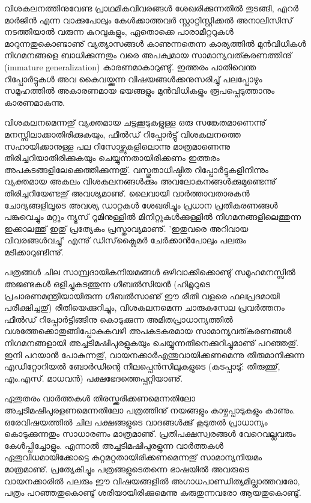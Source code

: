 വിശകലനത്തിനുവേണ്ട പ്രാഥമികവിവരങ്ങള്‍ ശേഖരിക്കുന്നതില്‍ തുടങ്ങി, എറര്‍ മാര്‍ജിന്‍ എന്ന വാക്കുപോലും 
കേള്‍ക്കാത്തവര്‍ സ്റ്റാറ്റിസ്റ്റിക്കല്‍ അനാലിസിസ് നടത്തിയാല്‍ വരുന്ന കുറവുകളും, ഏതൊക്കെ പാരാമീറ്ററുകള്‍ 
മാറുന്നതുകൊണ്ടാണു് വ്യത്യാസങ്ങള്‍ കാണുന്നതെന്ന കാര്യത്തില്‍ മുന്‍വിധികള്‍ നിഗമനങ്ങളെ ബാധിക്കുന്നതും വരെ 
അപക്വമായ സാമാന്യവത്കരണത്തിനു് (immature generalization) കാരണമാകാറുണ്ടു്. ഇത്തരം പാതിവെന്ത 
റിപ്പോര്‍ട്ടുകള്‍ അവ കൈവയ്ക്കുന്ന വിഷയങ്ങള്‍ക്കനുസരിച്ചു് പലപ്പോഴും സമൂഹത്തില്‍ അകാരണമായ ഭയങ്ങളും 
മുന്‍വിധികളും രൂപപ്പെടുത്താനും കാരണമാകുന്നു.

വിശകലനമെന്നതു് വ്യക്തമായ ചട്ടക്കൂടുകളുള്ള ഒരു സങ്കേതമാണെന്നു് മനസ്സിലാക്കാതിരിക്കുകയും, ഫീല്‍ഡ് 
റിപ്പോര്‍ട്ടു് വിശകലനത്തെ സഹായിക്കാനുള്ള പല റിസോഴ്സുകളിലൊന്നു മാത്രമാണെന്നു തിരിച്ചറിയാതിരിക്കുകയും 
ചെയ്യുന്നതായിരിക്കണം ഇത്തരം അപകടങ്ങളിലേക്കെത്തിക്കുന്നതു്. വസ്തുതാധിഷ്ഠിത റിപ്പോര്‍ട്ടുകളിനിന്നും 
വ്യക്തമായ അകലം വിശകലനങ്ങള്‍ക്കും അവലോകനങ്ങള്‍ക്കുമുണ്ടെന്നു് തിരിച്ചറിയേണ്ടതു് അവശ്യമാണു്. ലൈവായി 
വാര്‍ത്താവതാരകന്‍ ചോദ്യങ്ങളിലൂടെ അവശ്യ ഡാറ്റകള്‍ ശേഖരിച്ചും പ്രധാന പ്രതികരണങ്ങള്‍ പങ്കുവെച്ചും മറ്റും ന്യൂസ് 
റൂമിനുള്ളില്‍ മിനിറ്റുകള്‍ക്കുള്ളില്‍ നിഗമനങ്ങളിലെത്തുന്ന ഇക്കാലത്തു് ഇതു് പ്രത്യേകം പ്രസ്താവ്യമാണു്. 'ഇതുവരെ അറിവായ 
വിവരങ്ങള്‍വച്ചു്' എന്നു് ഡിസ്‌ക്ലൈമര്‍ ചേര്‍ക്കാന്‍പോലും പലരും മടിക്കാറുണ്ടിന്നു്.‌

പത്രങ്ങള്‍ ചില സാമ്പ്രദായികനിയമങ്ങള്‍ ഒഴിവാക്കിക്കൊണ്ടു് സമൂഹമനസ്സില്‍ അജണ്ടകള്‍ ഒളിച്ചുകടത്തുന്ന 
ഗീബല്‍സിയന്‍ (ഹിറ്റ്ലറുടെ പ്രചാരണമന്ത്രിയായിരുന്ന ഗീബല്‍സാണു് ഈ രീതി വളരെ ഫലപ്രദമായി പരീക്ഷിച്ചതു്) 
രീതിയെക്കുറിച്ചും, വിശകലനമെന്ന ചാരുകസേല പ്രവര്‍ത്തനം ഫീല്‍ഡ് റിപ്പോര്‍ട്ടിങ്ങിനു കൊടുക്കുന്ന 
അമിതപ്രാധാന്യത്തില്‍ വശത്തേക്കൊതുങ്ങിപ്പോകുകവഴി അപകടകരമായ സാമാന്യവത്കരണങ്ങള്‍ 
നിഗമനങ്ങളായി അച്ചടിമഷിപുരളുകയും ചെയ്യുന്നതിനെക്കുറിച്ചുമാണു് പറഞ്ഞതു്. ഇനി പറയാന്‍ പോകുന്നതു്, 
വായനക്കാര്‍എന്തുവായിക്കണമെന്നു തീരുമാനിക്കുന്ന എഡിറ്റോറിയല്‍ ബോര്‍ഡിന്റെ നീലപ്പെന്‍സിലുകളുടെ 
(കടപ്പാടു്: തിരുത്തു്, എം.എസ്. മാധവന്‍) പക്ഷഭേദത്തെപ്പറ്റിയാണു്.

ഏതുതരം വാര്‍ത്തകള്‍ തിരസ്ക്കരിക്കണമെന്നതിലോ അച്ചടിമഷിപുരളണമെന്നതിലോ പത്രത്തിനു് നയങ്ങളും 
കാഴ്ചപ്പാടുകളും കാണും. ഒരേവിഷയത്തില്‍ ചില പക്ഷങ്ങളുടെ വാദങ്ങള്‍ക്കു് കൂടുതല്‍ പ്രാധാന്യം കൊടുക്കുന്നതും 
സാധാരണം മാത്രമാണു്. പ്രതിപക്ഷസ്വരങ്ങള്‍ വേറെവല്ലവരും കേള്‍പ്പിച്ചോളും. എന്നാല്‍ അച്ചടിമഷിപുരളുന്ന 
വാര്‍ത്തകള്‍ ഏതുവിധമായിക്കോട്ടെ കുറ്റമറ്റതായിരിക്കണമെന്നതു് സാമാന്യനിയമം മാത്രമാണു്. പ്രത്യേകിച്ചും 
പത്രങ്ങളുടെതന്നെ ഭാഷയില്‍ അവരുടെ വായനക്കാരില്‍ പലരും ഈ വിഷയങ്ങളില്‍ 
അഗാധപാണ്ഡിത്യമില്ലാത്തവരോ, പത്രം പറഞ്ഞതുകൊണ്ടു് ശരിയായിരിക്കുമെന്നു കരുതുന്നവരോ ആയതുകൊണ്ടു്.


